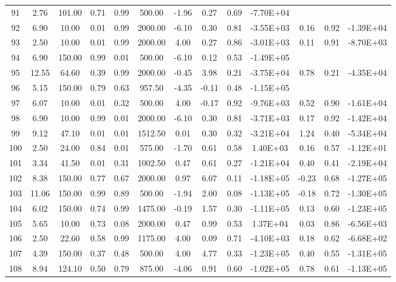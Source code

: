 \begin{landscape}
\begin{center}
\begin{longtable}{|c|c|c|c|c|c|c|c|c|c|c|c|c|}
91  & 2.76  & 101.00 & 0.71 & 0.99 & 500.00  & -1.96 & 0.27  & 0.69 & -7.70E+04 &       &      &           \\
92  & 6.90  & 10.00  & 0.01 & 0.99 & 2000.00 & -6.10 & 0.30  & 0.81 & -3.55E+03 & 0.16  & 0.92 & -1.39E+04 \\
93  & 2.50  & 10.00  & 0.01 & 0.99 & 2000.00 & 4.00  & 0.27  & 0.86 & -3.01E+03 & 0.11  & 0.91 & -8.70E+03 \\
94  & 6.90  & 150.00 & 0.99 & 0.01 & 500.00  & -6.10 & 0.12  & 0.53 & -1.49E+05 &       &      &           \\
95  & 12.55 & 64.60  & 0.39 & 0.99 & 2000.00 & -0.45 & 3.98  & 0.21 & -3.75E+04 & 0.78  & 0.21 & -4.35E+04 \\
96  & 5.15  & 150.00 & 0.79 & 0.63 & 957.50  & -4.35 & -0.11 & 0.48 & -1.15E+05 &   & & \\
97  & 6.07  & 10.00  & 0.01 & 0.32 & 500.00  & 4.00  & -0.17 & 0.92 & -9.76E+03 & 0.52  & 0.90 & -1.61E+04 \\
98  & 6.90  & 10.00  & 0.99 & 0.01 & 2000.00 & -6.10 & 0.30  & 0.81 & -3.71E+03 & 0.17  & 0.92 & -1.42E+04 \\
99  & 9.12  & 47.10  & 0.01 & 0.01 & 1512.50 & 0.01  & 0.30  & 0.32 & -3.21E+04 & 1.24  & 0.40 & -5.34E+04 \\
100 & 2.50  & 24.00  & 0.84 & 0.01 & 575.00  & -1.70 & 0.61  & 0.58 & 1.40E+03  & 0.16  & 0.57 & -1.12E+01 \\
101 & 3.34  & 41.50  & 0.01 & 0.31 & 1002.50 & 0.47  & 0.61  & 0.27 & -1.21E+04 & 0.40  & 0.41 & -2.19E+04 \\
102 & 8.38  & 150.00 & 0.77 & 0.67 & 2000.00 & 0.97  & 6.07  & 0.11 & -1.18E+05 & -0.23 & 0.68 & -1.27E+05 \\
103 & 11.06 & 150.00 & 0.99 & 0.89 & 500.00  & -1.94 & 2.00  & 0.08 & -1.13E+05 & -0.18 & 0.72 & -1.30E+05 \\
104 & 6.02  & 150.00 & 0.74 & 0.99 & 1475.00 & -0.19 & 1.57  & 0.30 & -1.11E+05 & 0.13  & 0.60 & -1.23E+05 \\
105 & 5.65  & 10.00  & 0.73 & 0.08 & 2000.00 & 0.47  & 0.99  & 0.53 & 1.37E+04  & 0.03  & 0.86 & -6.56E+03 \\
106 & 2.50  & 22.60  & 0.58 & 0.99 & 1175.00 & 4.00  & 0.09  & 0.71 & -4.10E+03 & 0.18  & 0.62 & -6.68E+02 \\
107 & 4.39  & 150.00 & 0.37 & 0.48 & 500.00  & 4.00  & 4.77  & 0.33 & -1.23E+05 & 0.40  & 0.55 & -1.31E+05 \\
108 & 8.94  & 124.10 & 0.50 & 0.79 & 875.00  & -4.06 & 0.91  & 0.60 & -1.02E+05 & 0.78  & 0.61 & -1.13E+05 \\

\end{longtable}
\end{center}
\end{landscape}
